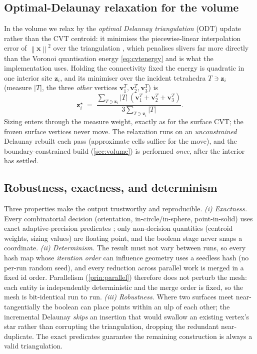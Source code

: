 \documentclass[11pt,a4paper]{article}
\numberwithin{equation}{section}
\newcommand{\norm}[1]{\left\lVert #1 \right\rVert}
\newcommand{\abs}[1]{\left\lvert #1 \right\rvert}
\newcommand{\vv}[1]{\mathbf{#1}}
\begin{document}
\subsection{Optimal-Delaunay relaxation for the volume}
\label{sec:odt}
In the volume we relax by the \emph{optimal Delaunay triangulation} (ODT) update
rather than the CVT centroid: it minimises the piecewise-linear interpolation
error of $\norm{\vv x}^2$ over the triangulation \cite{AlliezCohenSteiner2005},
which penalises slivers far more directly than the Voronoi quantisation energy
\eqref{eq:cvtenergy} and is what the implementation uses. Holding the
connectivity fixed the energy is quadratic in one interior site $\vv z_i$, and
its minimiser over the incident tetrahedra $T\ni\vv z_i$ (measure $\abs T$, the
three \emph{other} vertices $\vv v^{T}_{1},\vv v^{T}_{2},\vv v^{T}_{3}$) is
\begin{equation}
\label{eq:odt}
\vv z_i^{\star} \;=\;
\frac{\displaystyle\sum_{T\ni\vv z_i}\abs{T}\,(\vv v^{T}_{1}+\vv v^{T}_{2}+\vv v^{T}_{3})}
     {\displaystyle 3\sum_{T\ni\vv z_i}\abs{T}} .
\end{equation}
Sizing enters through the measure weight, exactly as for the surface CVT; the
frozen surface vertices never move. The relaxation runs on an \emph{unconstrained}
Delaunay rebuilt each pass (approximate cells suffice for the move), and the
boundary-constrained build (\cref{sec:volume}) is performed \emph{once}, after the
interior has settled.

\subsection{Robustness, exactness, and determinism}
\label{sec:determinism}
Three properties make the output trustworthy and reproducible.
\emph{(i) Exactness.} Every combinatorial decision (orientation,
in-circle/in-sphere, point-in-solid) uses exact adaptive-precision predicates
\cite{Shewchuk1997}; only non-decision quantities (centroid weights, sizing
values) are floating point, and the boolean stage never snaps a coordinate.
\emph{(ii) Determinism.} The result must not vary between runs, so every hash map
whose \emph{iteration order} can influence geometry uses a seedless hash (no
per-run random seed), and every reduction across parallel work is merged in a
fixed id order. Parallelism (\cref{prin:parallel}) therefore does not perturb the
mesh: each entity is independently deterministic and the merge order is fixed, so
the mesh is bit-identical run to run.
\emph{(iii) Robustness.} Where two surfaces meet near-tangentially the boolean
can place points within an ulp of each other; the incremental Delaunay
\emph{skips} an insertion that would swallow an existing vertex's star rather
than corrupting the triangulation, dropping the redundant near-duplicate. The
exact predicates guarantee the remaining construction is always a valid
triangulation.
\end{document}
